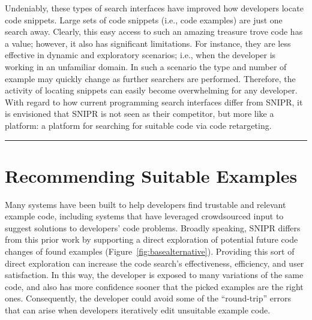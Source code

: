 Undeniably, these types of search interfaces have improved how developers locate code snippets. Large sets of code snippets (i.e., code examples) are just one search away. Clearly, this easy access to such an amazing treasure trove code has a value; however, it also has significant limitations. For instance, they are less effective in dynamic and exploratory scenarios; i.e., when the developer is working in an unfamiliar domain. In such a scenario the type and number of example may quickly change as further searchers are performed. Therefore, the activity of locating snippets can easily become overwhelming for any developer. With regard to how current programming search interfaces differ from \uppercase{SnipR}, it is envisioned that \uppercase{SnipR} is not seen as their competitor, but more like a platform: a platform for searching for suitable code via code retargeting.
% 
% 
 
\fancybreak{\pfbreakdisplay}

\section{Recommending Suitable Examples}
\label{sec:codesearch}

Many systems have been built to help developers find trustable and relevant example code, including systems that have leveraged crowdsourced input to suggest solutions to developers' code problems. Broadly speaking, \uppercase{SnipR} differs from this prior work by supporting a direct exploration of potential future code changes of found examples (Figure~\ref{fig:basealternative}). Providing this sort of direct exploration can increase the code search's effectiveness, efficiency, and user satisfaction. In this way, the developer is exposed to many variations of the same code, and also has more confidence sooner that the picked examples are the right ones. Consequently, the developer could avoid some of the ``round-trip'' errors that can arise when developers iteratively edit unsuitable example code.

